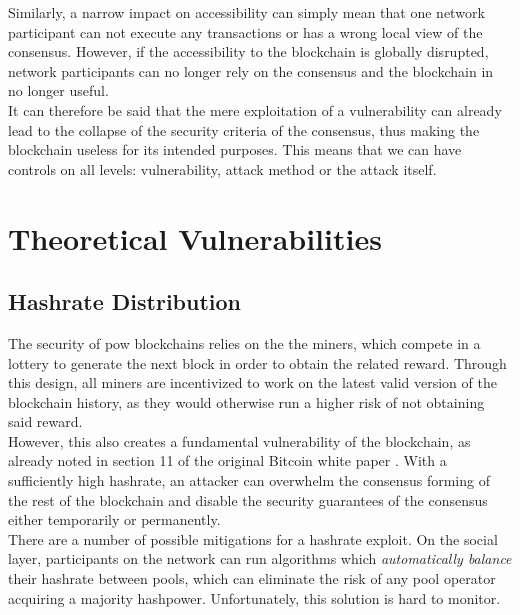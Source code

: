 \documentclass[12pt,a4paper]{article}
\begin{document}
Similarly, a narrow impact on accessibility can simply mean that one network participant can not execute any \glspl{transaction} or has a wrong local view of the \gls{consensus}. However, if the accessibility to the \gls{blockchain} is globally disrupted, network participants can no longer rely on the \gls{consensus} and the \gls{blockchain} in no longer useful.\\

It can therefore be said that the mere exploitation of a vulnerability can already lead to the collapse of the security criteria of the \gls{consensus}, thus making the \gls{blockchain} useless for its intended purposes. This means that we can have controls on all levels: vulnerability, attack method or the attack itself.\\

\section{Theoretical Vulnerabilities}

\subsection{Hashrate Distribution}

The security of \acrshort{pow} blockchains relies on the the miners, which compete in a lottery to generate the next block in order to obtain the related \gls{reward}. Through this design, all miners are incentivized to work on the latest valid version of the blockchain history, as they would otherwise run a higher risk of not obtaining said \gls{reward}.\\

However, this also creates a fundamental vulnerability of the \gls{blockchain}, as already noted in section 11 of the original Bitcoin white paper \cite{bitcoin}. With a sufficiently high \gls{hashrate}, an attacker can overwhelm the consensus forming of the rest of the \gls{blockchain} and disable the security guarantees of the \gls{consensus} either temporarily or permanently.\\

There are a number of possible mitigations for a hashrate exploit. On the social layer, participants on the network can run algorithms which \textit{automatically balance} their \gls{hashrate} between \glspl{pool}, which can eliminate the risk of any pool operator acquiring a majority hashpower. Unfortunately, this solution is hard to monitor.\\
\end{document}
